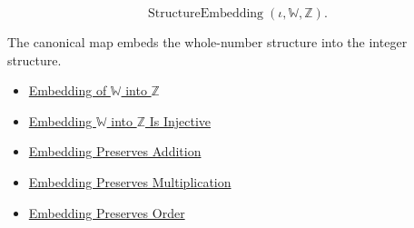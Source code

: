 \begin{remark*}
\[
\operatorname{StructureEmbedding}(\iota,\mathbb{W},\mathbb{Z}).
\]
\end{remark*}

\begin{remark*}[Interpretation]
The canonical map embeds the whole-number structure into the integer
structure.
\end{remark*}

\begin{dependencies}
\begin{itemize}
  \item \hyperref[def:canonical-embedding-w-into-z]{Embedding of $\mathbb{W}$ into $\mathbb{Z}$}
  \item \hyperref[thm:embedding-w-into-z-injective]{Embedding $\mathbb{W}$ into $\mathbb{Z}$ Is Injective}
  \item \hyperref[thm:embedding-w-into-z-preserves-addition]{Embedding Preserves Addition}
  \item \hyperref[thm:embedding-w-into-z-preserves-multiplication]{Embedding Preserves Multiplication}
  \item \hyperref[thm:embedding-w-into-z-preserves-order]{Embedding Preserves Order}
\end{itemize}
\end{dependencies}
